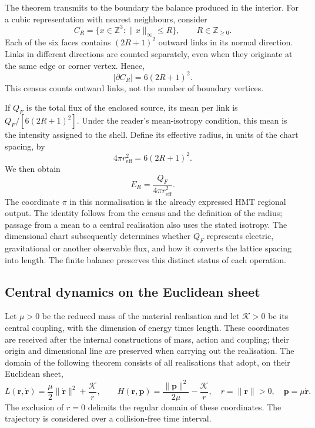 The theorem transmits to the boundary the balance produced in the
interior. For a cubic representation with nearest neighbours,
consider
\[
 C_R=\{x\in\mathbb Z^3:\|x\|_\infty\leq R\},
 \qquad R\in\mathbb Z_{\geq0}.
\]
Each of the six faces contains $(2R+1)^2$ outward
links in its normal direction. Links in different
directions are counted separately, even when they originate at
the same edge or corner vertex. Hence,
\begin{equation}
 |\partial C_R|=6(2R+1)^2.
 \label{vi:eq:frontera-cubica}
\end{equation}
This census counts outward links, not the number of
boundary vertices.

If $Q_F$ is the total flux of the enclosed source, its mean
per link is $Q_F/[6(2R+1)^2]$. Under the reader's mean-isotropy
condition, this mean is the intensity assigned to the
shell. Define its effective radius, in units of the chart
spacing, by
\begin{equation}
 4\pi r_{\mathrm{eff}}^2=6(2R+1)^2.
 \label{vi:eq:radio-efectivo}
\end{equation}
We then obtain
\begin{equation}
 E_R=\frac{Q_F}{4\pi r_{\mathrm{eff}}^2}.
 \label{vi:eq:inverso-area}
\end{equation}
The coordinate $\pi$ in this normalisation is the already expressed
HMT regional output. The identity follows from the census and the
definition of the radius; passage from a mean to a central
realisation also uses the stated isotropy. The dimensional
chart subsequently determines whether $Q_F$ represents electric,
gravitational or another observable flux, and how it converts the
lattice spacing into length. The finite balance preserves this
distinct status of each operation.

\subsection{Central dynamics on the Euclidean sheet}
\label{vi:subsec:dinamica-central}

Let $\mu>0$ be the reduced mass of the material realisation and let
$\mathcal K>0$ be its central coupling, with the dimension of
energy times length. These coordinates are received after
the internal constructions of mass, action and coupling;
their origin and dimensional line are preserved when carrying out the
realisation. The domain of the following theorem consists of all
realisations that adopt, on their Euclidean sheet,
\begin{equation}
 L(\mathbf r,\dot{\mathbf r})
 =\frac\mu2\|\dot{\mathbf r}\|^2+\frac{\mathcal K}{r},
 \qquad
 H(\mathbf r,\mathbf p)
 =\frac{\|\mathbf p\|^2}{2\mu}-\frac{\mathcal K}{r},
 \quad r=\|\mathbf r\|>0,
 \quad\mathbf p=\mu\dot{\mathbf r}.
 \label{vi:eq:kepler-lh}
\end{equation}
The exclusion of $r=0$ delimits the regular domain of these
coordinates. The trajectory is considered over a collision-free
time interval.

